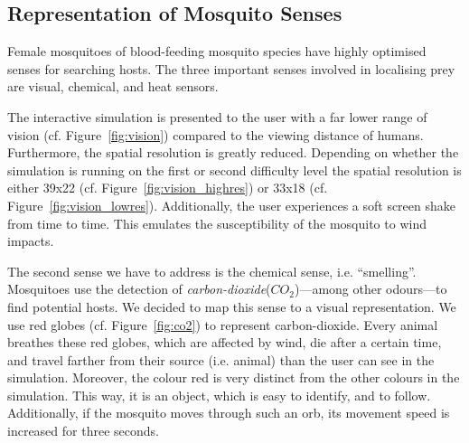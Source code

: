 \documentclass{sig-alternate-05-2015}
\begin{document}
\subsection{Representation of Mosquito Senses}
\label{sec:senses}
\noindent
Female mosquitoes of blood-feeding mosquito species have highly optimised senses for searching hosts. The three important senses involved in localising prey are visual, chemical, and heat sensors. 

The interactive simulation is presented to the user with a far lower range of vision (cf. Figure~\ref{fig:vision}) compared to the viewing distance of humans. Furthermore, the spatial resolution is greatly reduced. Depending on whether the simulation is running on the first or second difficulty level the spatial resolution is either 39x22 (cf. Figure~\ref{fig:vision_highres}) or 33x18 (cf. Figure~\ref{fig:vision_lowres}). Additionally, the user experiences a soft screen shake from time to time. This emulates the susceptibility of the mosquito to wind impacts.


The second sense we have to address is the chemical sense, i.e. ``smelling''. Mosquitoes use the detection of \textit{carbon-dioxide}($CO_2$)---among other odours---to find potential hosts. We decided to map this sense to a visual representation. We use red globes (cf. Figure~\ref{fig:co2}) to represent carbon-dioxide. Every animal breathes these red globes, which are affected by wind, die after a certain time, and travel farther from their source (i.e. animal) than the user can see in the simulation. Moreover, the colour red is very distinct from the other colours in the simulation. This way, it is an object, which is easy to identify, and to follow. Additionally, if the mosquito moves through such an orb, its movement speed is increased for three seconds.
\end{document}
